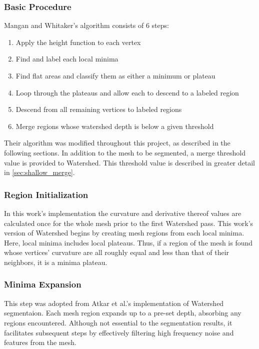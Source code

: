 \subsubsection{Basic Procedure}
Mangan and Whitaker's algorithm consists of 6 steps:
\begin{enumerate}
	\item Apply the height function to each vertex
	\item Find and label each local minima
	\item Find flat areas and classify them as either a minimum or plateau
	\item \label{plateau_step} Loop through the plateaus and allow each to descend to a labeled region
	\item Descend from all remaining vertices to labeled regions
	\item Merge regions whose watershed depth is below a given threshold
\end{enumerate}

Their algorithm was modified throughout this project, as described in the following sections.
In addition to the mesh to be segmented, a merge threshold value is provided to Watershed.
This threshold value is described in greater detail in \ref{sec:shallow_merge}.

\subsubsection{Region Initialization}\label{sec:ws_reg_init}
In this work's implementation the curvature and derivative thereof values are calculated once for the whole mesh prior to the first Watershed pass.
This work's version of Watershed begins by creating mesh regions from each local minima.
Here, local minima includes local plateaus.
Thus, if a region of the mesh is found whose vertices' curvature are all roughly equal and less than that of their neighbors, it is a minima plateau.

\subsubsection{Minima Expansion}
This step was adopted from Atkar et al.'s implementation of Watershed segmentaion\cite{HierSurfSeg_for_autobody_painting}.
Each mesh region expands up to a pre-set depth, absorbing any regions encountered.
Although not essential to the segmentation results, it facilitates subsequent steps by effectively filtering high frequency noise and features from the mesh.


